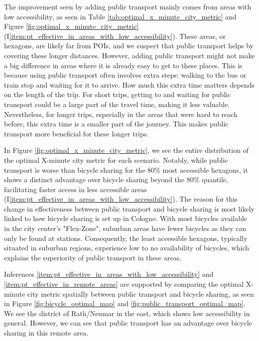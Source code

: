 The improvement seen by adding public transport mainly comes from areas with low accessibility, as seen in Table \ref{tab:optimal_x_minute_city_metric} and Figure \ref{fig:optimal_x_minute_city_metric} (I\ref{item:pt_effective_in_areas_with_low_accessibility}).
These areas, or hexagons, are likely far from POIs, and we suspect that public transport helps by covering these longer distances. 
However, adding public transport might not make a big difference in areas where it is already easy to get to these places. 
This is because using public transport often involves extra steps: walking to the bus or train stop and waiting for it to arrive. 
How much this extra time matters depends on the length of the trip.
For short trips, getting to and waiting for public transport could be a large part of the travel time, making it less valuable. 
Nevertheless, for longer trips, especially in the areas that were hard to reach before, this extra time is a smaller part of the journey. 
This makes public transport more beneficial for these longer trips. 

In Figure \ref{fig:optimal_x_minute_city_metric}, we see the entire distribution of the optimal X-minute city metric for each scenario.
Notably, while public transport is worse than bicycle sharing for the 80\% most accessible hexagons, it shows a distinct advantage over bicycle sharing beyond the 80\% quantile, facilitating faster access in less accessible areas (I\ref{item:pt_effective_in_areas_with_low_accessibility}).
The reason for this change in effectiveness between public transport and bicycle sharing is most likely linked to how bicycle sharing is set up in Cologne. 
With most bicycles available in the city center's "Flex-Zone", suburban areas have fewer bicycles as they can only be found at stations.
Consequently, the least accessible hexagons, typically situated in suburban regions, experience low to no availability of bicycles, which explains the superiority of public transport in these areas. 

Inferences \ref{item:pt_effective_in_areas_with_low_accessibility} and \ref{item:pt_effective_in_remote_areas} are supported by comparing the optimal X-minute city metric spatially between public transport and bicycle sharing, as seen in Figure \ref{fig:bicycle_optimal_map} and \ref{fig:public_transport_optimal_map}.
We see the district of Rath/Neumar in the east, which shows low accessibility in general.
However, we can see that public transport has an advantage over bicycle sharing in this remote area.


